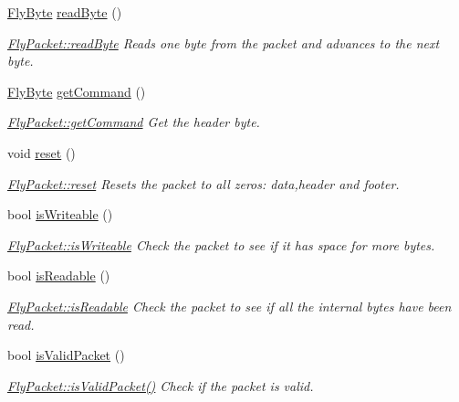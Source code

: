 \begin{DoxyCompactItemize}
\hyperlink{conversions_8h_a1f006e31a957accfe6aa1bf6f401efce}{Fly\+Byte} \hyperlink{class_fly_packet_af3e863f81ee5de3fb73ec200efac0924}{read\+Byte} ()
\begin{DoxyCompactList}\small\item\em \hyperlink{class_fly_packet_af3e863f81ee5de3fb73ec200efac0924}{Fly\+Packet\+::read\+Byte} Reads one byte from the packet and advances to the next byte. \end{DoxyCompactList}\item 
\hyperlink{conversions_8h_a1f006e31a957accfe6aa1bf6f401efce}{Fly\+Byte} \hyperlink{class_fly_packet_af0989edccb2cff9652f5a3c38fd210a2}{get\+Command} ()
\begin{DoxyCompactList}\small\item\em \hyperlink{class_fly_packet_af0989edccb2cff9652f5a3c38fd210a2}{Fly\+Packet\+::get\+Command} Get the header byte. \end{DoxyCompactList}\item 
void \hyperlink{class_fly_packet_aaac4cf49c1ef150d0e4e59c2377cedd3}{reset} ()
\begin{DoxyCompactList}\small\item\em \hyperlink{class_fly_packet_aaac4cf49c1ef150d0e4e59c2377cedd3}{Fly\+Packet\+::reset} Resets the packet to all zeros\+: data,header and footer. \end{DoxyCompactList}\item 
bool \hyperlink{class_fly_packet_a1e63a54895660739a5232b5b546fcf07}{is\+Writeable} ()
\begin{DoxyCompactList}\small\item\em \hyperlink{class_fly_packet_a1e63a54895660739a5232b5b546fcf07}{Fly\+Packet\+::is\+Writeable} Check the packet to see if it has space for more bytes. \end{DoxyCompactList}\item 
bool \hyperlink{class_fly_packet_a9c1a141b4b44004015618da46829200d}{is\+Readable} ()
\begin{DoxyCompactList}\small\item\em \hyperlink{class_fly_packet_a9c1a141b4b44004015618da46829200d}{Fly\+Packet\+::is\+Readable} Check the packet to see if all the internal bytes have been read. \end{DoxyCompactList}\item 
bool \hyperlink{class_fly_packet_a71175af24ccf498579c804aa21500db5}{is\+Valid\+Packet} ()
\begin{DoxyCompactList}\small\item\em \hyperlink{class_fly_packet_a71175af24ccf498579c804aa21500db5}{Fly\+Packet\+::is\+Valid\+Packet()} Check if the packet is valid. \end{DoxyCompactList}\item 

\end{DoxyCompactItemize}
